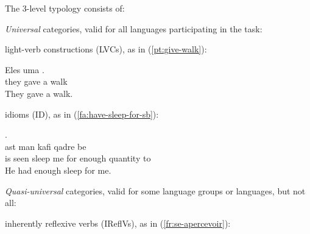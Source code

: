 \documentclass[output=paper,
modfonts,
]{langscibook}
\begin{document}
The 3-level typology consists of:
\begin{senum}
\item \textit{Universal} categories, valid for all languages participating in the task:
\begin{senum}
\item light-verb constructions (LVCs), as in (\ref{pt:give-walk}):

\ea \label{pt:give-walk}
\settowidth {} 
\gll Eles  uma .\\
they gave a walk \\ 
\glt They gave a walk. 
\z

\item idioms (ID), as in (\ref{fa:have-sleep-for-sb}):

\ea \label{fa:have-sleep-for-sb}
\settowidth {} 
\glll .       \\
ast   man  kafi qadre be  \\
is seen sleep me for enough quantity to\\ 
\glt He had enough sleep for me. 
\z

\end{senum}
\item \textit{Quasi-universal} categories, valid for some language groups or languages, but not all:
\begin{senum}
\item inherently reflexive verbs (IReflVs), as in (\ref{fr:se-apercevoir}):


\end{senum}
\end{senum}
\end{document}
